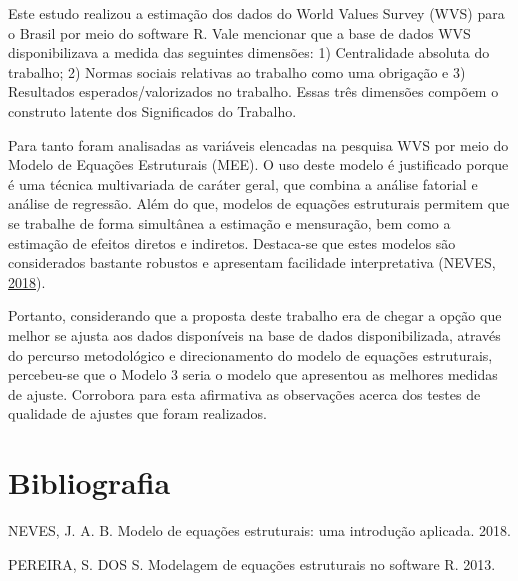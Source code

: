 \documentclass[
  12pt,
]{article}
\newenvironment{cslreferences}%
  {}%
  {\par}
\begin{document}
Este estudo realizou a estimação dos dados do World Values Survey (WVS)
para o Brasil por meio do software R. Vale mencionar que a base de dados
WVS disponibilizava a medida das seguintes dimensões: 1) Centralidade
absoluta do trabalho; 2) Normas sociais relativas ao trabalho como uma
obrigação e 3) Resultados esperados/valorizados no trabalho. Essas três
dimensões compõem o construto latente dos Significados do Trabalho.

Para tanto foram analisadas as variáveis elencadas na pesquisa WVS por
meio do Modelo de Equações Estruturais (MEE). O uso deste modelo é
justificado porque é uma técnica multivariada de caráter geral, que
combina a análise fatorial e análise de regressão. Além do que, modelos
de equações estruturais permitem que se trabalhe de forma simultânea a
estimação e mensuração, bem como a estimação de efeitos diretos e
indiretos. Destaca-se que estes modelos são considerados bastante
robustos e apresentam facilidade interpretativa (NEVES,
\protect\hyperlink{ref-neves2018modelo}{2018}).

Portanto, considerando que a proposta deste trabalho era de chegar a
opção que melhor se ajusta aos dados disponíveis na base de dados
disponibilizada, através do percurso metodológico e direcionamento do
modelo de equações estruturais, percebeu-se que o Modelo 3 seria o
modelo que apresentou as melhores medidas de ajuste. Corrobora para esta
afirmativa as observações acerca dos testes de qualidade de ajustes que
foram realizados.

\hypertarget{bibliografia}{%
\section*{Bibliografia}\label{bibliografia}}

\hypertarget{refs}{}
\begin{cslreferences}
\leavevmode\hypertarget{ref-neves2018modelo}{}%
NEVES, J. A. B. Modelo de equações estruturais: uma introdução aplicada.
2018.

\leavevmode\hypertarget{ref-pereira2013modelagem}{}%
PEREIRA, S. DOS S. Modelagem de equações estruturais no software R.
2013.
\end{cslreferences}
\end{document}
